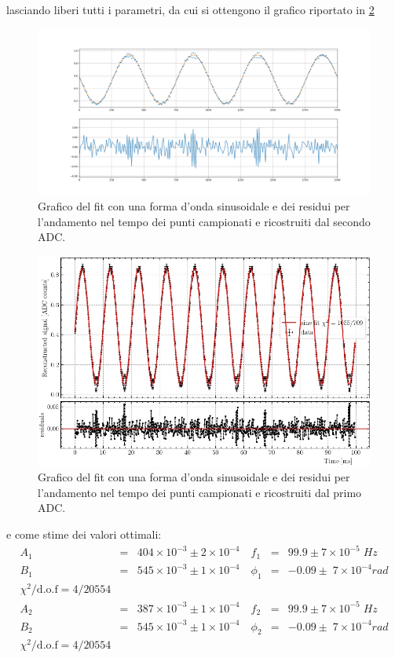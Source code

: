 \documentclass[10pt, a4paper, italian]{article}
\begin{document}
lasciando liberi tutti i parametri, da cui si ottengono il grafico riportato 
in \ref{fig: sinfit}
\begin{figure}[htbp]
    \centering
	\includegraphics[width=\textwidth]{sinfit}
    \caption{Grafico del fit con una forma d'onda sinusoidale e dei residui
    per l'andamento nel tempo dei punti campionati e ricostruiti dal secondo ADC.
    \label{fig: sinfit}}
\end{figure}
\begin{figure}[htbp]
    \centering
	\includegraphics[width=\textwidth]{sinfit2}
    \caption{Grafico del fit con una forma d'onda sinusoidale e dei residui
    per l'andamento nel tempo dei punti campionati e ricostruiti dal primo ADC.
    \label{fig: sinfit}}
\end{figure}
e come stime dei valori ottimali:
\begin{align*}
A_1 &=& 404 \times 10^{-3} \pm 2 \times 10^{-4} \quad f_1 &=& 99.9\pm 7 \times 10^{-5}\; \si{Hz} \\
B_1 &=& 545 \times 10^{-3} \pm 1 \times 10^{-4}\quad \phi_1 &=& -0.09 \pm \; 7 \times 10^{-4}\si{rad} \\
\chi^2/\text{d.o.f} =  4 / 20554
\end{align*}
\begin{align*}
A_2 &=& 387 \times 10^{-3} \pm 1 \times 10^{-4} \quad f_2 &=& 99.9\pm 7 \times 10^{-5}\; \si{Hz} \\
B_2 &=& 545 \times 10^{-3} \pm 1 \times 10^{-4}\quad \phi_2 &=& -0.09 \pm \; 7 \times 10^{-4}\si{rad} \\
\chi^2/\text{d.o.f} =  4 / 20554
\end{align*}
\end{document}
